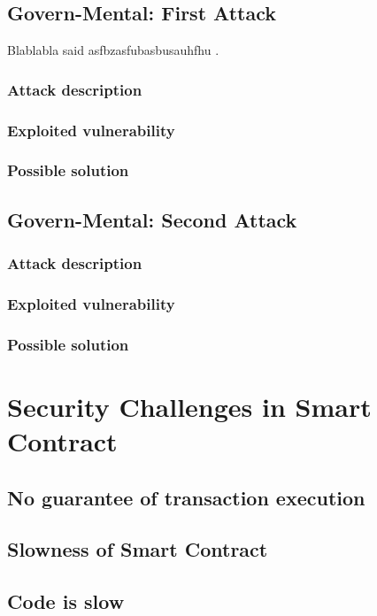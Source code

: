 \subsection{Govern-Mental: First Attack}
Blablabla said asfbzasfubasbusauhfhu \cite{WinNT}.
\subsubsection{Attack description}
\subsubsection{Exploited vulnerability}
\subsubsection{Possible solution}

\subsection{Govern-Mental: Second Attack}
\subsubsection{Attack description}
\subsubsection{Exploited vulnerability}
\subsubsection{Possible solution}

\section{Security Challenges in Smart Contract}
\subsection{No guarantee of transaction execution}
\subsection{Slowness of Smart Contract}
\subsection{Code is slow}

